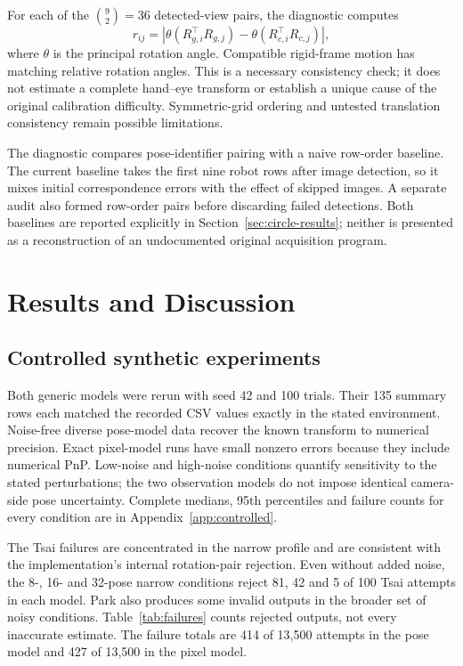 \documentclass[12pt,a4paper]{article}
\begin{document}
For each of the $\binom92=36$ detected-view pairs, the diagnostic computes
\begin{equation}\label{eq:circle}
r_{ij}=\left|\theta(R_{g,i}^\top R_{g,j})-
\theta(R_{c,i}^\top R_{c,j})\right|,
\end{equation}
where $\theta$ is the principal rotation angle. Compatible rigid-frame motion has matching relative rotation angles. This is a necessary consistency check; it does not estimate a complete hand--eye transform or establish a unique cause of the original calibration difficulty. Symmetric-grid ordering and untested translation consistency remain possible limitations. \cite{opencvsource,experimentcode}

The diagnostic compares pose-identifier pairing with a naive row-order baseline. The current baseline takes the first nine robot rows after image detection, so it mixes initial correspondence errors with the effect of skipped images. A separate audit also formed row-order pairs before discarding failed detections. Both baselines are reported explicitly in Section~\ref{sec:circle-results}; neither is presented as a reconstruction of an undocumented original acquisition program. \cite{experimentcode}

\clearpage
\section{Results and Discussion}\label{sec:results}
\subsection{Controlled synthetic experiments}
Both generic models were rerun with seed 42 and 100 trials. Their 135 summary rows each matched the recorded CSV values exactly in the stated environment. Noise-free diverse pose-model data recover the known transform to numerical precision. Exact pixel-model runs have small nonzero errors because they include numerical PnP. Low-noise and high-noise conditions quantify sensitivity to the stated perturbations; the two observation models do not impose identical camera-side pose uncertainty. Complete medians, 95th percentiles and failure counts for every condition are in Appendix~\ref{app:controlled}. \cite{experimentcode}



The Tsai failures are concentrated in the narrow profile and are consistent with the implementation's internal rotation-pair rejection. Even without added noise, the 8-, 16- and 32-pose narrow conditions reject 81, 42 and 5 of 100 Tsai attempts in each model. Park also produces some invalid outputs in the broader set of noisy conditions. Table~\ref{tab:failures} counts rejected outputs, not every inaccurate estimate. The failure totals are 414 of 13,500 attempts in the pose model and 427 of 13,500 in the pixel model. \cite{experimentcode,opencvsource}
\end{document}
